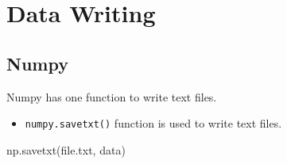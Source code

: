 \documentclass[
  letterpaper,
  DIV=11,
  numbers=noendperiod]{scrreprt}
\newenvironment{Shaded}{\begin{snugshade}}{\end{snugshade}}
\newcommand{\NormalTok}[1]{\textcolor[rgb]{0.00,0.23,0.31}{#1}}
\newcommand{\StringTok}[1]{\textcolor[rgb]{0.13,0.47,0.30}{#1}}
\providecommand{\tightlist}{%
  \setlength{\itemsep}{0pt}\setlength{\parskip}{0pt}}\usepackage{longtable,booktabs,array}
\begin{document}
\chapter*{Data Writing}\label{data-writing}


\section*{Numpy}\label{numpy-2}


Numpy has one function to write text files.

\begin{itemize}
\tightlist
\item
  \texttt{numpy.savetxt()} function is used to write text files.
\end{itemize}

\begin{Shaded}
\begin{Highlighting}[]
\NormalTok{np.savetxt(}\StringTok{\textquotesingle{}file.txt\textquotesingle{}}\NormalTok{, data)}
\end{Highlighting}
\end{Shaded}
\end{document}
